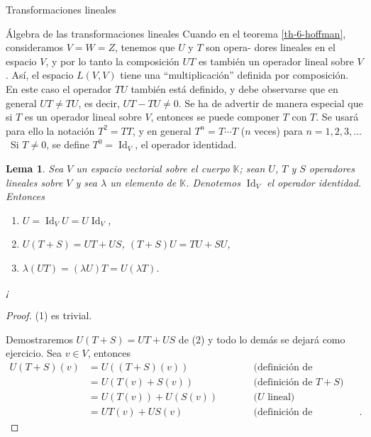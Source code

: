 \documentclass[a4paper,12pt,twoside,spanish,reqno]{amsbook}
\newtheorem{lema}[teorema]{Lema}
\theoremstyle{definition}
\theoremstyle{remark}
\newcommand{\Id}{\operatorname{Id}}
\newcommand{\K}{\mathbb K}
\begin{document}
\begin{chapter}{Transformaciones lineales}
\begin{section}{Álgebra de las transformaciones lineales}
        Cuando  en el teorema \ref{th-6-hoffman}, consideramos $V = W = Z$, tenemos que $U$ y $T$ son opera-
        dores lineales en el espacio $V$, y por lo tanto la composición $UT$ es también un operador lineal sobre $V$. Así, el espacio $L(V, V)$ tiene una ``multiplicación'' definida por composición. En este caso el operador $TU$ también está definido, y debe observarse que en general $UT \not= TU$, es decir, $UT - TU \not= 0$. Se ha de advertir de manera especial que si $T$ es un operador lineal sobre $V$, entonces se puede componer $T$ con $T$. Se usará para ello la notación $T^2 = TT$, y en general $T^n = T \cdots T$ ($n$ veces) para $n = 1, 2, 3, \ldots$\,  Si $T \ne 0$, se define $T^0 = \Id_V$, el operador identidad.
            
        \begin{lema}
            Sea $V$ un espacio vectorial sobre el cuerpo $\K$; sean $U$, $T$ y $S$ operadores lineales sobre $V$ y sea $\lambda$ un elemento de $\K$. Denotemos $\Id_V$ el operador identidad. Entonces
            \begin{enumerate}
                \item $U = \Id_VU = U\Id_V$,
                \item $U(T+S) = UT + US$, $(T+S)U = TU + SU$,
                \item $\lambda (UT) = (\lambda U)T = U (\lambda T)$.
            \end{enumerate}¡
        \end{lema}
        \begin{proof}
            (1) es trivial. 
            
            Demostraremos $U(T+S) = UT + US$ de (2) y todo lo demás se dejará como ejercicio.
            Sea $ v \in V$, entonces
            \begin{equation*}
            \begin{array}{rlll}
            U(T+S)(v) &= U((T+S)(v))&\qquad&\text{(definición de composición)} \\
            &= U(T(v)+S(v))&\qquad&\text{(definición  de $T+S$)} \\
            &= U(T(v))+U(S(v))&\qquad&\text{($U$ lineal)} \\
            &= UT(v)+US(v)&\qquad&\text{(definición de composición)}.
            \end{array}
            \end{equation*}  
        \end{proof}	
    

\end{section}
\end{chapter}
\end{document}
